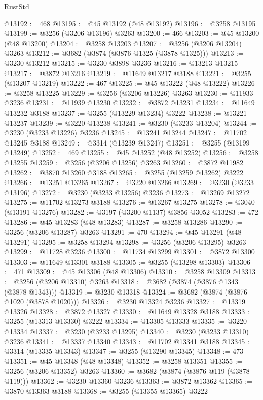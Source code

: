 \begin{lexlean}{RustStd}
\begin{coremodule}
@13192 := 468
@13195 := @45 @13192 (@48 @13192)
@13196 := @3258 @13195
@13199 := @3256 (@3206 @13196) @3263
@13200 := 466
@13203 := @45 @13200 (@48 @13200)
@13204 := @3258 @13203
@13207 := @3256 (@3206 @13204) @3263
@13212 := @3682 (@3874 (@3876 @1325 (@3878 @1325)))
@13213 := @3230 @13212
@13215 := @3230 @3898 @3236
@13216 := @13213 @13215
@13217 := @3872 @13216
@13219 := @11649 @13217 @3188
@13221 := @3255 (@13207 @13219)
@13222 := 467
@13225 := @45 @13222 (@48 @13222)
@13226 := @3258 @13225
@13229 := @3256 (@3206 @13226) @3263
@13230 := @11933 @3236
@13231 := @11939 @13230
@13232 := @3872 @13231
@13234 := @11649 @13232 @3188
@13237 := @3255 (@13229 @13234) @3222
@13238 := @13221 @13237
@13239 := @3220 @13238
@13241 := @3230 (@3233 @13204)
@13244 := @3230 (@3233 @13226) @3236
@13245 := @13241 @13244
@13247 := @11702 @13245 @3188
@13249 := @3314 (@13239 @13247)
@13251 := @3255 (@13199 @13249)
@13252 := 469
@13255 := @45 @13252 (@48 @13252)
@13256 := @3258 @13255
@13259 := @3256 (@3206 @13256) @3263
@13260 := @3872 @11982
@13262 := @3870 @13260 @3188
@13265 := @3255 (@13259 @13262) @3222
@13266 := @13251 @13265
@13267 := @3220 @13266
@13269 := @3230 (@3233 @13196)
@13272 := @3230 (@3233 @13256) @3236
@13273 := @13269 @13272
@13275 := @11702 @13273 @3188
@13276 := @13267 @13275
@13278 := @3040 (@13191 @13276)
@13282 := @3197 (@3200 @1137) @3856 @3052
@13283 := 472
@13286 := @45 @13283 (@48 @13283)
@13287 := @3258 @13286
@13290 := @3256 (@3206 @13287) @3263
@13291 := 470
@13294 := @45 @13291 (@48 @13291)
@13295 := @3258 @13294
@13298 := @3256 (@3206 @13295) @3263
@13299 := @11728 @3236
@13300 := @11734 @13299
@13301 := @3872 @13300
@13303 := @11649 @13301 @3188
@13305 := @3255 (@13298 @13303)
@13306 := 471
@13309 := @45 @13306 (@48 @13306)
@13310 := @3258 @13309
@13313 := @3256 (@3206 @13310) @3263
@13318 := @3682 (@3874 (@3876 @1343 (@3878 @1343)))
@13319 := @3230 @13318
@13324 := @3682 (@3874 (@3876 @1020 (@3878 @1020)))
@13326 := @3230 @13324 @3236
@13327 := @13319 @13326
@13328 := @3872 @13327
@13330 := @11649 @13328 @3188
@13333 := @3255 (@13313 @13330) @3222
@13334 := @13305 @13333
@13335 := @3220 @13334
@13337 := @3230 (@3233 @13295)
@13340 := @3230 (@3233 @13310) @3236
@13341 := @13337 @13340
@13343 := @11702 @13341 @3188
@13345 := @3314 (@13335 @13343)
@13347 := @3255 (@13290 @13345)
@13348 := 473
@13351 := @45 @13348 (@48 @13348)
@13352 := @3258 @13351
@13355 := @3256 (@3206 @13352) @3263
@13360 := @3682 (@3874 (@3876 @119 (@3878 @119)))
@13362 := @3230 @13360 @3236
@13363 := @3872 @13362
@13365 := @3870 @13363 @3188
@13368 := @3255 (@13355 @13365) @3222

\end{coremodule}
\end{lexlean}
